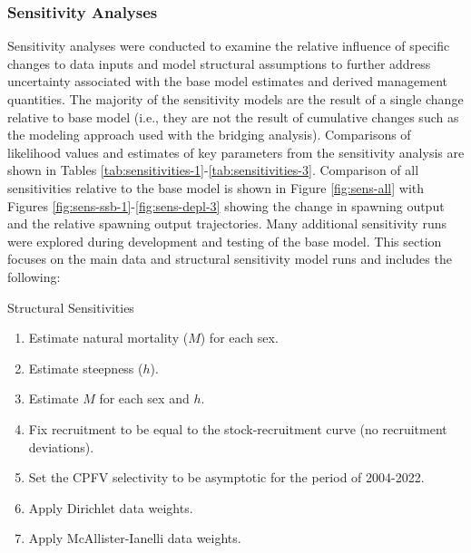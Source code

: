 \documentclass[11pt,
  english,
  letterpaper,
]{article}
\begin{document}
\hypertarget{sensitivities}{%
\subsubsection{Sensitivity Analyses}\label{sensitivities}}

Sensitivity analyses were conducted to examine the relative influence of specific changes to data inputs and model structural assumptions to further address uncertainty associated with the base model estimates and derived management quantities. The majority of the sensitivity models are the result of a single change relative to base model (i.e., they are not the result of cumulative changes such as the modeling approach used with the bridging analysis). Comparisons of likelihood values and estimates of key parameters from the sensitivity analysis are shown in Tables \ref{tab:sensitivities-1}-\ref{tab:sensitivities-3}. Comparison of all sensitivities relative to the base model is shown in Figure \ref{fig:sens-all} with Figures \ref{fig:sens-ssb-1}-\ref{fig:sens-depl-3} showing the change in spawning output and the relative spawning output trajectories. Many additional sensitivity runs were explored during development and testing of the base model. This section focuses on the main data and structural sensitivity model runs and includes the following:

Structural Sensitivities

\begin{enumerate}
   
  \item  Estimate natural mortality ($M$) for each sex.
  
  \item Estimate steepness ($h$).
  
  \item Estimate $M$ for each sex and $h$.
  
  \item Fix recruitment to be equal to the stock-recruitment curve (no recruitment deviations).
  
  \item Set the CPFV selectivity to be asymptotic for the period of 2004-2022.
  
  \item Apply Dirichlet data weights.
  
  \item Apply McAllister-Ianelli data weights.

\end{enumerate}
\end{document}
